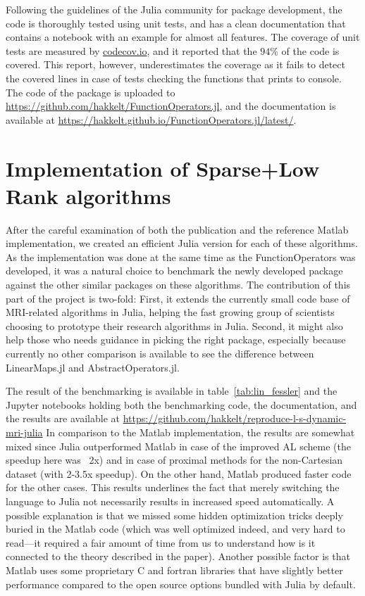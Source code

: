 Following the guidelines of the Julia community for package development, the code is thoroughly tested using unit tests, and has a clean documentation that contains a notebook with an example for almost all features. The coverage of unit tests are measured by \url{codecov.io}, and it reported that the $94\%$ of the code is covered. This report, however, underestimates the coverage as it fails to detect the covered lines in case of tests checking the functions that prints to console. The code of the package is uploaded to \url{https://github.com/hakkelt/FunctionOperators.jl}, and the documentation is available at \url{https://hakkelt.github.io/FunctionOperators.jl/latest/}.

\section{Implementation of Sparse+Low Rank algorithms}

After the careful examination of both the publication and the reference Matlab implementation, we created an efficient Julia version for each of these algorithms. As the implementation was done at the same time as the FunctionOperators was developed, it was a natural choice to benchmark the newly developed package against the other similar packages on these algorithms. The contribution of this part of the project is two-fold: First, it extends the currently small code base of MRI-related algorithms in Julia, helping the fast growing group of scientists choosing to prototype their research algorithms in Julia. Second, it might also help those who needs guidance in picking the right package, especially because currently no other comparison is available to see the difference between LinearMaps.jl and AbstractOperators.jl.

The result of the benchmarking is available in table~\ref{tab:lin_fessler} and the Jupyter notebooks holding both the benchmarking code, the documentation, and the results are available at \url{https://github.com/hakkelt/reproduce-l-s-dynamic-mri-julia}
In comparison to the Matlab implementation, the results are somewhat mixed since Julia outperformed Matlab in case of the improved AL scheme (the speedup here was ~2x) and in case of proximal methods for the non-Cartesian dataset (with 2-3.5x speedup). On the other hand, Matlab produced faster code for the other cases. This results underlines the fact that merely switching the language to Julia not necessarily results in increased speed automatically. A possible explanation is that we missed some hidden optimization tricks deeply buried in the Matlab code (which was well optimized indeed, and very hard to read---it required a fair amount of time from us to understand how is it connected to the theory described in the paper). Another possible factor is that Matlab uses some proprietary C and fortran libraries that have slightly better performance compared to the open source options bundled with Julia by default.

